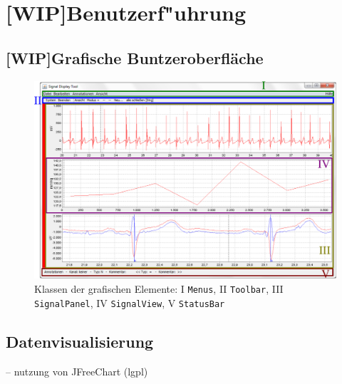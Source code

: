 \section{[WIP]Benutzerf"uhrung}



\subsection{[WIP]Grafische Buntzeroberfl\"ache}

\begin{figure}[htb]
\centering
\includegraphics[width=\textwidth]{bilder/programm_ansicht.eps}
\caption[Klassen der grafischen Elemente]{Klassen der grafischen Elemente: I \texttt{Menus}, II \texttt{Toolbar}, III \texttt{SignalPanel}, IV \texttt{SignalView}, V \texttt{StatusBar}}
\label{pic:gui_elements_and_classes}
\end{figure}

\subsection{Datenvisualisierung}

-- nutzung von JFreeChart (\ac{lgpl})

